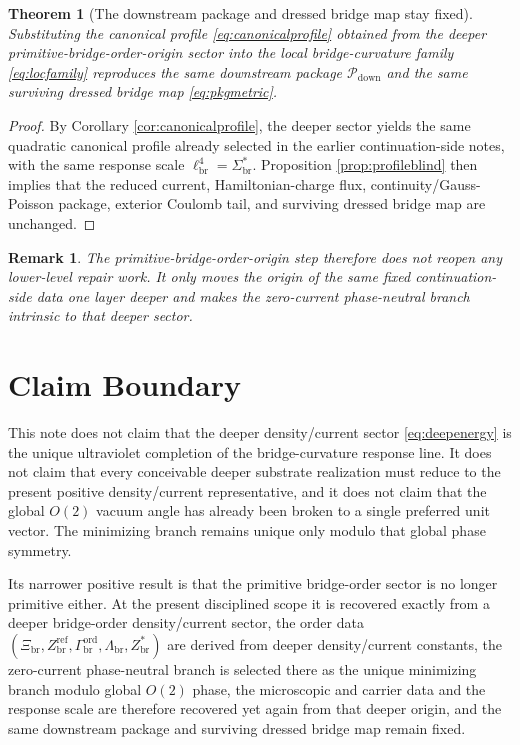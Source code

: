 \documentclass[11pt]{article}
\newcommand{\CurvScale}{\ell_{\mathrm{br}}}
\newcommand{\DownPkg}{\mathscr P_{\mathrm{down}}}
\newcommand{\RespSusEq}{\Sigma_{\mathrm{br}}^{\ast}}
\newcommand{\RespOrderRef}{Z_{\mathrm{br}}^{\mathrm{ref}}}
\newcommand{\RespOrderEq}{Z_{\mathrm{br}}^{\ast}}
\newcommand{\RespOrderReadout}{\Xi_{\mathrm{br}}}
\newcommand{\RespOrderStiff}{\Gamma_{\mathrm{br}}^{\mathrm{ord}}}
\newcommand{\RespOrderQuartic}{\Lambda_{\mathrm{br}}}
\newtheorem{remark}{Remark}
\newtheorem{theorem}{Theorem}
\begin{document}
\begin{theorem}[The downstream package and dressed bridge map stay fixed]
\label{thm:fixedpackage}
Substituting the canonical profile \eqref{eq:canonicalprofile} obtained from the deeper primitive-bridge-order-origin sector into the local bridge-curvature family \eqref{eq:locfamily} reproduces the same downstream package \(\DownPkg\) and the same surviving dressed bridge map \eqref{eq:pkgmetric}.
\end{theorem}

\begin{proof}
By Corollary \ref{cor:canonicalprofile}, the deeper sector yields the same quadratic canonical profile already selected in the earlier continuation-side notes, with the same response scale \(\CurvScale^4=\RespSusEq\). Proposition \ref{prop:profileblind} then implies that the reduced current, Hamiltonian-charge flux, continuity/Gauss-Poisson package, exterior Coulomb tail, and surviving dressed bridge map are unchanged.
\end{proof}

\begin{remark}
The primitive-bridge-order-origin step therefore does not reopen any lower-level repair work. It only moves the origin of the same fixed continuation-side data one layer deeper and makes the zero-current phase-neutral branch intrinsic to that deeper sector.
\end{remark}

\section{Claim Boundary}

This note does not claim that the deeper density/current sector \eqref{eq:deepenergy} is the unique ultraviolet completion of the bridge-curvature response line. It does not claim that every conceivable deeper substrate realization must reduce to the present positive density/current representative, and it does not claim that the global \(O(2)\) vacuum angle has already been broken to a single preferred unit vector. The minimizing branch remains unique only modulo that global phase symmetry.

Its narrower positive result is that the primitive bridge-order sector is no longer primitive either. At the present disciplined scope it is recovered exactly from a deeper bridge-order density/current sector, the order data \((\RespOrderReadout,\RespOrderRef,\RespOrderStiff,\RespOrderQuartic,\RespOrderEq)\) are derived from deeper density/current constants, the zero-current phase-neutral branch is selected there as the unique minimizing branch modulo global \(O(2)\) phase, the microscopic and carrier data and the response scale are therefore recovered yet again from that deeper origin, and the same downstream package and surviving dressed bridge map remain fixed.
\end{document}
